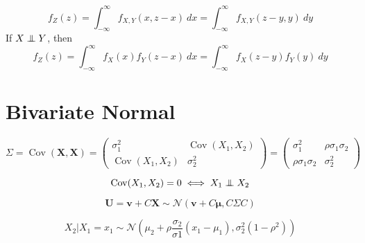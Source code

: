 \documentclass[twocolumn]{amsart}
\newcommand{\Cov}{\operatorname{Cov}}
\newcommand\independent{\protect\mathpalette{\protect\independenT}{\perp}}
\def\independenT#1#2{\mathrel{\rlap{$#1#2$}\mkern3mu{#1#2}}}
\begin{document}
\begin{equation*}
  f_{Z}(z)=\int_{-\infty}^{\infty}f_{X,Y}(x,z-x)~dx = \int_{-\infty}^{\infty}f_{X,Y}(z-y,y)~dy
\end{equation*}
If \(X \independent Y\), then
\begin{equation*}
  f_{Z}(z)=\int_{-\infty}^{\infty}f_{X}(x)f_{Y}(z-x)~dx = \int_{-\infty}^{\infty}f_{X}(z-y)f_{Y}(y)~dy
\end{equation*}

\section*{Bivariate Normal}
\begin{equation*}
  \Sigma = \Cov(\boldsymbol{X},\boldsymbol{X})
  = \begin{pmatrix}
    \sigma_{1}^{2}&\Cov(X_{1},X_{2})\\
      \Cov(X_{1},X_{2})&\sigma_{2}^{2}
  \end{pmatrix}
  = \begin{pmatrix}
    \sigma_{1}^{2}&\rho\sigma_{1}\sigma_{2}\\
      \rho\sigma_{1}\sigma_{2}&\sigma_{2}^{2}
  \end{pmatrix}
\end{equation*}


\begin{equation*}
  \Cov(X_{1},X_{2}) = 0 \iff X_{1} \independent X_{2}
\end{equation*}

\begin{equation*}
  \boldsymbol{U} = \boldsymbol{v} + C\boldsymbol{X} \sim
  \mathcal{N}(\boldsymbol{v} + C\boldsymbol{\mu},C\Sigma C)
\end{equation*}

\begin{equation*}
  X_{2} | X_{1} = x_{1} \sim \mathcal{N}(\mu_{2} + \rho
  \frac{\sigma_{2}}{\sigma{1}}(x_{1} - \mu_{1}),\sigma_{2}^{2}(1-\rho^{2}))
\end{equation*}
\end{document}

